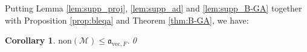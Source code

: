 \documentclass[11pt]{amsart}
\newcommand{\LM}{\mathcal{M}}
\newcommand{\LA}{\mathcal{A}}
\renewcommand{\b}{\mathfrak{b}}
\renewcommand{\a}{\mathfrak{a}}
\newtheorem{thm}{Theorem}[section]
\newtheorem{lemma}[thm]{Lemma}
\newtheorem{cor}[thm]{Corollary}
\theoremstyle{definition}
\theoremstyle{remark}
\newcommand{\supp}{\mathrm{supp}}
\newcommand{\ZFC}{\mathsf{ZFC}}
\renewcommand{\1}{\mathbf{1}}
\newcommand{\FIN}{\mathrm{FIN}}
\newcommand{\FU}{\mathrm{FU}}
\begin{document}
Putting Lemma \ref{lem:supp_proj}, \ref{lem:supp_ad} and \ref{lem:supp_B-GA} together with Proposition \ref{prop:bleqa} and Theorem \ref{thm:B-GA}, we have:

\begin{cor}\label{cor:nonMleqa_vec}
	$\mathrm{non}(\LM)\leq\a_{\mathrm{vec},F}$.\qed%
\end{cor}

%
%
%
%
%
%
\end{document}
